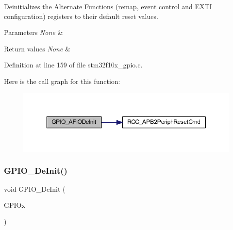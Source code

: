 Deinitializes the Alternate Functions (remap, event control and E\+X\+TI configuration) registers to their default reset values. 


\begin{DoxyParams}{Parameters}
{\em None} & \\
\hline
\end{DoxyParams}

\begin{DoxyRetVals}{Return values}
{\em None} & \\
\hline
\end{DoxyRetVals}


Definition at line 159 of file stm32f10x\+\_\+gpio.\+c.

Here is the call graph for this function\+:
\nopagebreak
\begin{figure}[H]
\begin{center}
\leavevmode
\includegraphics[width=350pt]{group___g_p_i_o___exported___functions_ga7f645e6b6146818c3d6c19021e70170c_cgraph}
\end{center}
\end{figure}
\mbox{\label{group___g_p_i_o___exported___functions_gaa60bdf3182c44b5fa818f237042f52ee}} 
\subsubsection{\texorpdfstring{G\+P\+I\+O\+\_\+\+De\+Init()}{GPIO\_DeInit()}}
{\footnotesize\ttfamily void G\+P\+I\+O\+\_\+\+De\+Init (\begin{DoxyParamCaption}\item[{\hyperlink{struct_g_p_i_o___type_def}{G\+P\+I\+O\+\_\+\+Type\+Def} $\ast$}]{G\+P\+I\+Ox }\end{DoxyParamCaption})}



